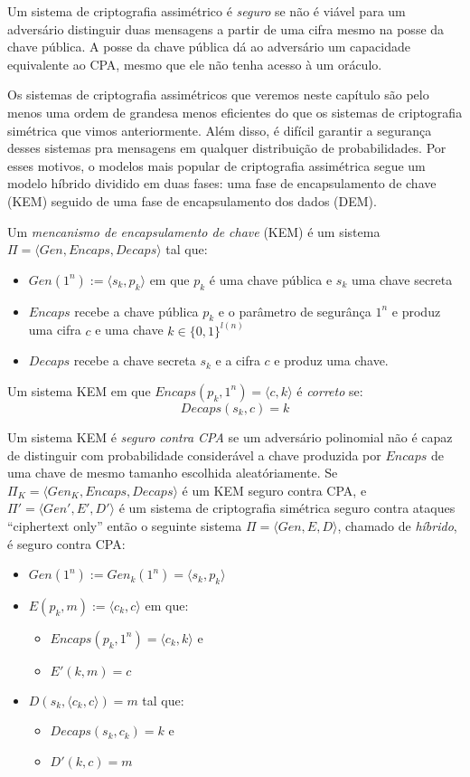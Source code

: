 Um sistema de criptografia assimétrico é {\em seguro} se não é viável para um adversário distinguir duas mensagens a partir de uma cifra mesmo na posse da chave pública.
A posse da chave pública dá ao adversário um capacidade equivalente ao CPA, mesmo que ele não tenha acesso à um oráculo.

Os sistemas de criptografia assimétricos que veremos neste capítulo são pelo menos uma ordem de grandesa menos eficientes do que os sistemas de criptografia simétrica que vimos anteriormente.
Além disso, é difícil garantir a segurança desses sistemas pra mensagens em qualquer distribuição de probabilidades.
Por esses motivos, o modelos mais popular de criptografia assimétrica segue um modelo híbrido dividido em duas fases: uma fase de encapsulamento de chave (KEM) seguido de uma fase de encapsulamento dos dados (DEM).

Um {\em mencanismo de encapsulamento de chave} (KEM) é um sistema $\Pi = \langle Gen, Encaps, Decaps \rangle$ tal que:
\begin{itemize}
\item $Gen(1^n) := \langle s_k, p_k \rangle$ em que $p_k$ é uma chave pública e $s_k$ uma chave secreta
\item $Encaps$ recebe a chave pública $p_k$ e o parâmetro de segurânça $1^n$ e produz uma cifra $c$ e uma chave $k \in \{0,1\}^{l(n)}$
\item $Decaps$ recebe a chave secreta $s_k$ e a cifra $c$ e produz uma chave.
\end{itemize}
 
Um sistema KEM em que $Encaps(p_k, 1^n) = \langle c, k \rangle$ é {\em correto} se:
\begin{displaymath}
  Decaps(s_k, c) =  k
\end{displaymath}

Um sistema KEM é {\em seguro contra CPA} se um adversário polinomial não é capaz de distinguir com probabilidade considerável a chave produzida por $Encaps$ de uma chave de mesmo tamanho escolhida aleatóriamente.
Se $\Pi_K = \langle Gen_K, Encaps, Decaps \rangle$ é um KEM seguro contra CPA, e $\Pi' = \langle Gen', E', D' \rangle$ é um sistema de criptografia simétrica seguro contra ataques ``ciphertext only'' então o seguinte sistema $\Pi = \langle Gen, E, D \rangle$, chamado de {\em híbrido}, é seguro contra CPA:

\begin{itemize}
\item $Gen(1^n) := Gen_k(1^n) = \langle s_k, p_k \rangle$
\item $E(p_k, m) := \langle c_k, c \rangle$ em que: 
\begin{itemize}
\item $Encaps(p_k, 1^n) = \langle c_k, k \rangle$ e
\item $E'(k, m) = c$
\end{itemize}
\item $D(s_k,\langle c_k, c \rangle) = m$ tal que:
\begin{itemize}
\item $Decaps(s_k, c_k) = k$ e
\item $D'(k, c) = m$
\end{itemize}
\end{itemize}

